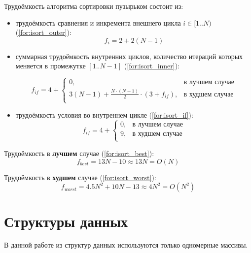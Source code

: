 \documentclass[12pt]{report}
\begin{document}
	Трудоёмкость алгоритма сортировки пузырьком состоит из:
	\begin{itemize}
		\item трудоёмкость сравнения и инкремента внешнего цикла $i \in [1..N)$ (\ref{for:isort_outer}):
		\begin{equation}
			\label{for:isort_outer}
			f_{i} = 2 + 2(N - 1)
		\end{equation}
		\item суммарная трудоёмкость внутренних циклов, количество итераций которых меняется в промежутке $[1..N-1]$ (\ref{for:isort_inner}):
		
		\begin{equation}
			\label{for:isort_inner}
			f_{if} = 4 + \begin{cases}
				0, & \text{в лучшем случае}\\
				3(N - 1) + \frac{N \cdot (N - 1)}{2} \cdot (3 + f_{if}), & \text{в худшем случае}\\
			\end{cases}
		\end{equation}
		
		\item трудоёмкость условия во внутреннем цикле (\ref{for:isort_if}):
		\begin{equation}
			\label{for:isort_if}
			f_{if} = 4 + \begin{cases}
				0, & \text{в лучшем случае}\\
				9, & \text{в худшем случае}\\
			\end{cases}
		\end{equation}
	\end{itemize}
	
	Трудоёмкость в \textbf{лучшем} случае (\ref{for:isort_best}):
	\begin{equation}
		\label{for:isort_best}
		f_{best} = 13N - 10 \approx 13N = O(N)
	\end{equation}
	
	Трудоёмкость в \textbf{худшем} случае (\ref{for:isort_worst}):
	\begin{equation}
		\label{for:isort_worst}
		f_{worst} = 4.5N^2 + 10N - 13 \approx 4N^2 = O(N^{2})
	\end{equation}

	\section{Структуры данных}
	В данной работе из структур данных используются только одномерные массивы.
	
\end{document}
